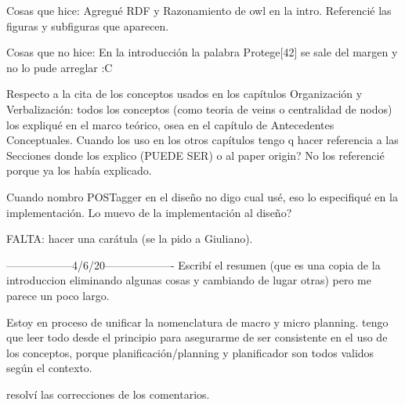 Cosas que hice:
Agregué RDF y Razonamiento de owl en la intro.
Referencié las figuras y subfiguras que aparecen.

Cosas que no hice:
En la introducción la palabra Protege[42] se sale del margen y no lo pude arreglar :C

Respecto a la cita de los conceptos usados en los capítulos Organización y Verbalización: todos los conceptos 
(como teoria de veins o centralidad de nodos) los expliqué en el marco teórico, osea en el capítulo de Antecedentes Conceptuales. Cuando los uso en los otros capítulos tengo q hacer referencia a las Secciones donde los explico (PUEDE SER) o al paper origin? No los referencié porque ya los había explicado.

Cuando nombro POSTagger en el diseño no digo cual usé, eso lo especifiqué en la implementación. Lo muevo de la implementación al diseño?


FALTA: hacer una carátula (se la pido a Giuliano).

------------------4/6/20-------------------
Escribí el resumen (que es una copia de la introduccion eliminando algunas cosas y cambiando de lugar otras) pero me parece un poco largo.

Estoy en proceso de unificar la nomenclatura de macro y micro planning. tengo que leer todo desde el principio para asegurarme de ser consistente en el uso de los conceptos, porque planificación/planning y planificador son todos validos según el contexto.

resolví las correcciones de los comentarios.